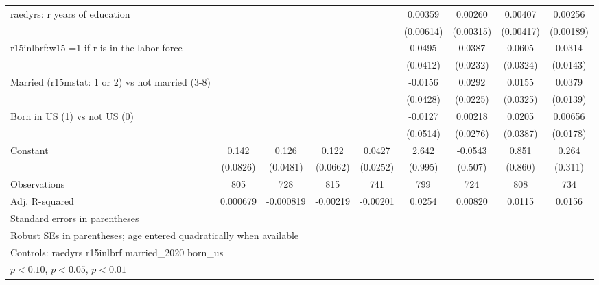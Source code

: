 \begin{table}[htbp]
\begin{tabular}{l*{8}{c}}
\addlinespace
raedyrs: r years of education&                  &                  &                  &                  &  0.00359         &  0.00260         &  0.00407         &  0.00256         \\
                &                  &                  &                  &                  &(0.00614)         &(0.00315)         &(0.00417)         &(0.00189)         \\
\addlinespace
r15inlbrf:w15 =1 if r is in the labor force&                  &                  &                  &                  &   0.0495         &   0.0387\sym{*}  &   0.0605\sym{*}  &   0.0314\sym{**} \\
                &                  &                  &                  &                  & (0.0412)         & (0.0232)         & (0.0324)         & (0.0143)         \\
\addlinespace
Married (r15mstat: 1 or 2) vs not married (3-8)&                  &                  &                  &                  &  -0.0156         &   0.0292         &   0.0155         &   0.0379\sym{***}\\
                &                  &                  &                  &                  & (0.0428)         & (0.0225)         & (0.0325)         & (0.0139)         \\
\addlinespace
Born in US (1) vs not US (0)&                  &                  &                  &                  &  -0.0127         &  0.00218         &   0.0205         &  0.00656         \\
                &                  &                  &                  &                  & (0.0514)         & (0.0276)         & (0.0387)         & (0.0178)         \\
\addlinespace
Constant        &    0.142\sym{*}  &    0.126\sym{***}&    0.122\sym{*}  &   0.0427\sym{*}  &    2.642\sym{***}&  -0.0543         &    0.851         &    0.264         \\
                & (0.0826)         & (0.0481)         & (0.0662)         & (0.0252)         &  (0.995)         &  (0.507)         &  (0.860)         &  (0.311)         \\
\midrule
Observations    &      805         &      728         &      815         &      741         &      799         &      724         &      808         &      734         \\
Adj. R-squared  & 0.000679         &-0.000819         & -0.00219         & -0.00201         &   0.0254         &  0.00820         &   0.0115         &   0.0156         \\
\bottomrule
\multicolumn{9}{l}{\footnotesize Standard errors in parentheses}\\
\multicolumn{9}{l}{\footnotesize Robust SEs in parentheses; age entered quadratically when available}\\
\multicolumn{9}{l}{\footnotesize Controls:  raedyrs r15inlbrf married\_2020 born\_us}\\
\multicolumn{9}{l}{\footnotesize \sym{*} \(p<0.10\), \sym{**} \(p<0.05\), \sym{***} \(p<0.01\)}\\
\end{tabular}
\end{table}
